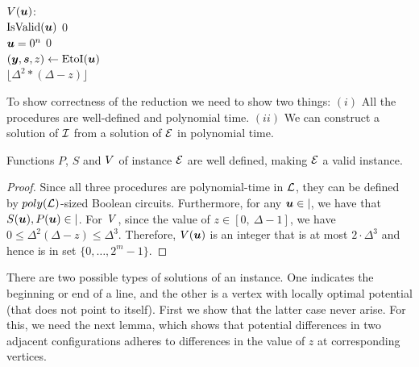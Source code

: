 \begin{algo}
\underline{$\mbox{$V$}(\mbox{\boldmath $u$})$}:\+
\\\IfB \NotB $\mbox{IsValid}(\mbox{\boldmath $u$})$ \ThenB \ReturnB $0$
\\\IfB $\mbox{\boldmath $u$}=0^n$ \ThenB \ReturnB $0$
\\$(\mbox{\boldmath $y$},\mbox{\boldmath $s$},z) \gets \mbox{EtoI}(\mbox{\boldmath $u$})$
\\\ReturnB $\lfloor \Delta^2*(\Delta -z)\rfloor$
\end{algo}

To show correctness of the reduction we need to show two things: $(i)$ All the procedures are well-defined and polynomial time. $(ii)$ We can construct a solution of $\mbox{${\mathcal I}$}$ from a solution of $\mbox{${\mathcal E}$}$ in polynomial time. 

\begin{lemma}\label{lem:PSF}
Functions $P$, $S$ and $\mbox{$V$}$ of instance $\mbox{${\mathcal E}$}$ are well defined, making $\mbox{${\mathcal E}$}$ a valid \EOPL instance. 
\end{lemma}
\begin{proof}
Since all three procedures are polynomial-time in $\mbox{${\mathcal L}$}$, they can be defined
by $poly(\mbox{${\mathcal L}$})$-sized Boolean circuits. Furthermore, for any $\mbox{\boldmath $u$} \in \vert$,
we have that $S(\mbox{\boldmath $u$}),P(\mbox{\boldmath $u$}) \in \vert$. For~$\mbox{$V$}$, 
since the value of $z \in [0,\ \Delta-1]$, we
have $0\le \Delta^2(\Delta-z)\le \Delta^3$. Therefore, $\mbox{$V$}(\mbox{\boldmath $u$})$ is an
integer that is at most $2 \cdot \Delta^3$ and hence is in set $\{0,\dots, 2^m-1\}$. 
\end{proof}

There are two possible types of solutions of an \EOPL instance. One indicates
the beginning or end of a line, and the other is a vertex with locally optimal
potential (that does not point to itself). 
First we show that the latter case never arise. For this, we need the
next lemma, which shows that potential differences in two adjacent
configurations adheres to differences in the value of $z$ at corresponding
vertices.

